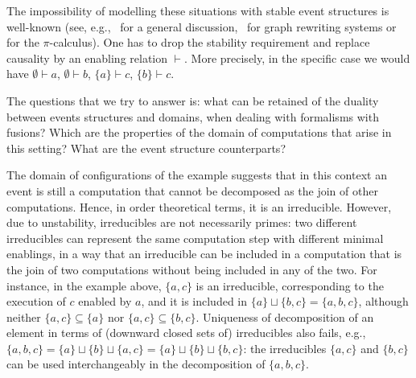 \documentclass[conference]{IEEEtran}
\begin{document}
The impossibility of modelling these situations with stable
event structures 
is well-known (see,
e.g.,~\cite{Win:ES} for a general discussion,~\cite{Handbook} for
graph rewriting systems or~\cite{CVY:ESSPE} for the $\pi$-calculus). One has
to drop the stability requirement and replace causality
by an enabling relation $\vdash$. More precisely, in the specific case 
we would have
$\emptyset \vdash a$, $\emptyset \vdash b$, $\{ a \} \vdash c$,
$\{ b \} \vdash c$.


\medskip

The questions that we try to answer is: what can be retained of the
duality between events structures and domains, when 
dealing with formalisms with fusions? Which are the properties of 
the domain of computations that arise in this setting? What are the 
event structure counterparts?

The domain of configurations of the example suggests that in this
context an event is still a computation that cannot be decomposed
as the join of other computations. Hence, in order theoretical terms,
it is an irreducible.
%
However, %
%
due to unstability, irreducibles are not {necessarily} primes: two different
irreducibles can {represent the same computation step with different minimal enablings}, 
in
a way that an irreducible can be included in a computation that is the
join of two computations without being included in any of the two. For
instance, in the example above, $\{ a, c \}$ is an irreducible,
corresponding to the execution of $c$ enabled by $a$, and it is
included in $\{ a \} \sqcup \{ b, c \} = \{ a, b , c \}$,
although neither
$\{ a, c \} \subseteq \{ a \}$ nor
$\{ a, c \} \subseteq \{ b , c \}$.
%
Uniqueness of decomposition of an element in terms of (downward closed sets of) irreducibles
also fails, e.g.,
$\{a,b,c\} = \{a\} \sqcup \{b\} \sqcup \{a,c\} = \{a\} \sqcup \{b\} \sqcup
\{b,c\}$: the irreducibles $\{a,c\}$ and $\{b,c\}$ can be used
interchangeably in the decomposition of $\{a,b,c\}$.
\end{document}
